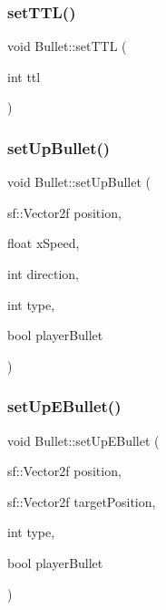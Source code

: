 \mbox{\label{class_bullet_abbf2bd440aade1c9f0f8f61d333ca64a}} 
\subsubsection{\texorpdfstring{set\+T\+T\+L()}{setTTL()}}
{\footnotesize\ttfamily void Bullet\+::set\+T\+TL (\begin{DoxyParamCaption}\item[{int}]{ttl }\end{DoxyParamCaption})}

\mbox{\label{class_bullet_a2ac1e1ac43af3bbd0d7c2a72e0e17e51}} 
\subsubsection{\texorpdfstring{set\+Up\+Bullet()}{setUpBullet()}}
{\footnotesize\ttfamily void Bullet\+::set\+Up\+Bullet (\begin{DoxyParamCaption}\item[{sf\+::\+Vector2f}]{position,  }\item[{float}]{x\+Speed,  }\item[{int}]{direction,  }\item[{int}]{type,  }\item[{bool}]{player\+Bullet }\end{DoxyParamCaption})}

\mbox{\label{class_bullet_afa7788ce043c909b96c37a0265755000}} 
\subsubsection{\texorpdfstring{set\+Up\+E\+Bullet()}{setUpEBullet()}}
{\footnotesize\ttfamily void Bullet\+::set\+Up\+E\+Bullet (\begin{DoxyParamCaption}\item[{sf\+::\+Vector2f}]{position,  }\item[{sf\+::\+Vector2f}]{target\+Position,  }\item[{int}]{type,  }\item[{bool}]{player\+Bullet }\end{DoxyParamCaption})}

